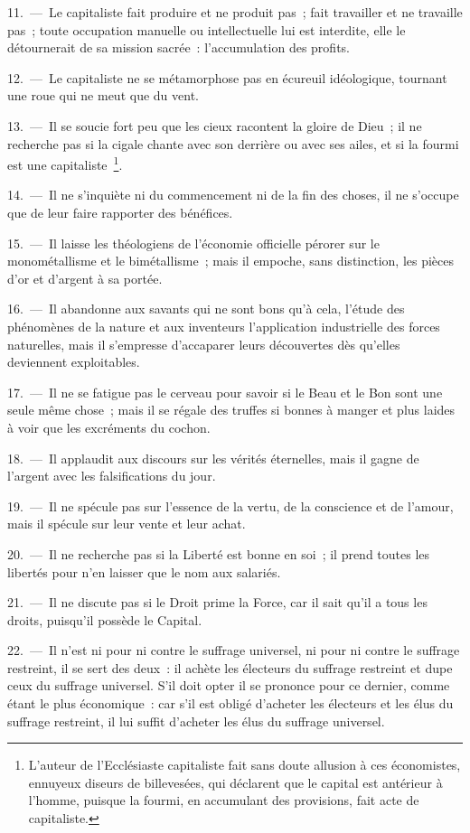 \documentclass[french,twoside]{book} %
\begin{document}
11. — Le capitaliste fait produire et ne produit pas ; fait travailler et ne travaille pas ; toute occupation manuelle ou intellectuelle lui est interdite, elle le détournerait de sa mission sacrée : l’accumulation des profits.\par
12. — Le capitaliste ne se métamorphose pas en écureuil idéologique, tournant une roue qui ne meut que du vent.\par
13. — Il se soucie fort peu que les cieux racontent la gloire de Dieu ; il ne recherche pas si la cigale chante avec son derrière ou avec ses ailes, et si la fourmi est une capitaliste \footnote{L'auteur de l’Ecclésiaste capitaliste fait sans doute allusion à ces économistes, ennuyeux diseurs de billevesées, qui déclarent que le capital est antérieur à l’homme, puisque la fourmi, en accumulant des provisions, fait acte de capitaliste.}.\par
14. — Il ne s’inquiète ni du commencement ni de la fin des choses, il ne s’occupe que de leur faire rapporter des bénéfices.\par
15. — Il laisse les théologiens de l’économie officielle pérorer sur le monométallisme et le bimétallisme ; mais il empoche, sans distinction, les pièces d’or et d’argent à sa portée.\par
16. — Il abandonne aux savants qui ne sont bons qu’à cela, l’étude des phénomènes de la nature et aux inventeurs l’application industrielle des forces naturelles, mais il s’empresse d’accaparer leurs découvertes dès qu’elles deviennent exploitables.\par
17. — Il ne se fatigue pas le cerveau pour savoir si le Beau et le Bon sont une seule même chose ; mais il se régale des truffes si bonnes à manger et plus laides à voir que les excréments du cochon.\par
18. — Il applaudit aux discours sur les vérités éternelles, mais il gagne de l’argent avec les falsifications du jour.\par
19. — Il ne spécule pas sur l’essence de la vertu, de la conscience et de l’amour, mais il spécule sur leur vente et leur achat.\par
20. — Il ne recherche pas si la Liberté est bonne en soi ; il prend toutes les libertés pour n’en laisser que le nom aux salariés.\par
21. — Il ne discute pas si le Droit prime la Force, car il sait qu’il a tous les droits, puisqu’il possède le Capital.\par
22. — Il n’est ni pour ni contre le suffrage universel, ni pour ni contre le suffrage restreint, il se sert des deux : il achète les électeurs du suffrage restreint et dupe ceux du suffrage universel. S'il doit opter il se prononce pour ce dernier, comme étant le plus économique : car s’il est obligé d’acheter les électeurs et les élus du suffrage restreint, il lui suffit d’acheter les élus du suffrage universel.\par
\end{document}
